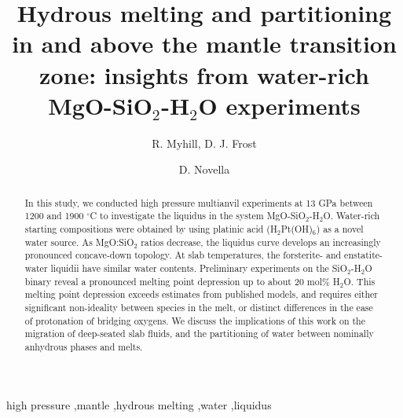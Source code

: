 \documentclass[review]{elsarticle}
\begin{document}
\begin{frontmatter}

\title{Hydrous melting and partitioning in and above the mantle transition zone: insights from water-rich MgO-SiO$_2$-H$_2$O experiments}

\author{R. Myhill, D. J. Frost}
\address{Bayerisches Geoinstitut, Universit\"{a}t Bayreuth, Universit\"{a}tsstrasse 30, 95447 Bayreuth, Germany}

\author{D. Novella}
\address{Laboratoire Magmas et Volcans, Universit\'{e} Blaise Pascal, 5 Rue Kessler, 63038 Clermond-Ferrand, France}




\begin{abstract}

In this study, we conducted high pressure multianvil experiments at 13 GPa between 1200 and 1900 $^{\circ}$C to investigate the liquidus in the system MgO-SiO$_2$-H$_2$O. Water-rich starting compositions were obtained by using platinic acid (H$_2$Pt(OH)$_6$) as a novel water source. As MgO:SiO$_2$ ratios decrease, the liquidus curve develops an increasingly pronounced concave-down topology. At slab temperatures, the forsterite- and enstatite-water liquidii have similar water contents. Preliminary experiments on the SiO$_2$-H$_2$O binary reveal a pronounced melting point depression up to about 20 mol\% H$_2$O. This melting point depression exceeds estimates from published models, and requires either significant non-ideality between species in the melt, or distinct differences in the ease of protonation of bridging oxygens. We discuss the implications of this work on the migration of deep-seated slab fluids, and the partitioning of water between nominally anhydrous phases and melts.
\end{abstract}

\begin{keyword}
high pressure \sep mantle \sep hydrous melting \sep water \sep liquidus
\end{keyword}

\end{frontmatter}
\end{document}
